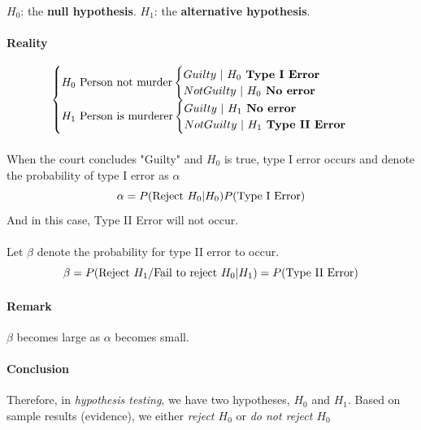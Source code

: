 \documentclass{article}
\begin{document}
		\paragraph{} $H_0$: the \textbf{null hypothesis}. $H_1$: the \textbf{alternative hypothesis}.
		\paragraph{Reality}
			\[
				\begin{cases}
					H_0 \text{{ Person not murder}}
						\begin{cases}
							Guilty\ \vert \ H_0\textbf{ Type I Error}\\
							NotGuilty\ \vert \ H_0 \textbf{ No error}
						\end{cases} \\
					H_1 \text{{ Person is murderer}}
						\begin{cases}
							Guilty\ \vert \ H_1 \textbf{ No error}\\
							NotGuilty\ \vert \ H_1 \textbf{ Type II Error}\\
						\end{cases}
				\end{cases}
			\]
		\paragraph{}When the court concludes "Guilty" and $H_0$ is true, type I error occurs and denote the probability of type I error as $\alpha$
			\[
				\alpha = P(\text{{Reject $H_0$}} \vert H_0) P(\text{{Type I Error}})
			\]
			And in this case, Type II Error will not occur.
		\paragraph{}Let $\beta$ denote the probability for type II error to occur.
			\[
				\beta = P(\text{{Reject $H_1$/Fail to reject $H_0$}} \vert H_1) = P(\text{{Type II Error}})
			\]
		\paragraph{Remark} $\beta$ becomes large as $\alpha$ becomes small. 
		\paragraph{Conclusion} Therefore, in \emph{hypothesis testing}, we have two hypotheses, $H_0$ and $H_1$. Based on sample results (evidence), we either \emph{reject $H_0$} or \emph{do not reject $H_0$}
	
\end{document}
